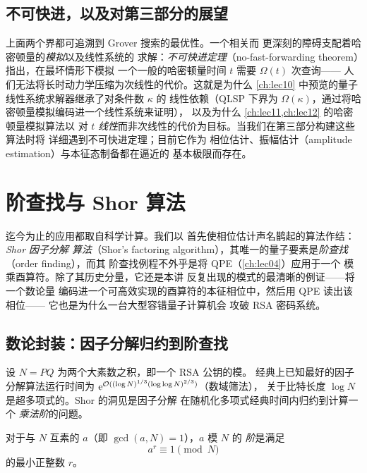 \subsection*{不可快进，以及对第三部分的展望}

上面两个界都可追溯到 Grover 搜索的最优性。一个相关而
更深刻的障碍支配着哈密顿量的\emph{模拟}以及线性系统的
求解：\emph{不可快进定理}（no-fast-forwarding theorem）指出，在最坏情形下模拟
一个一般的哈密顿量时间 $t$ 需要 $\Omega(t)$ 次查询——
人们无法将长时动力学压缩为次线性的代价。这就是为什么
\cref{ch:lec10} 中预览的量子线性系统求解器继承了对条件数 $\kappa$ 的
线性依赖（QLSP 下界为
$\Omega(\kappa)$，通过将哈密顿量模拟编码进一个线性系统来证明），
以及为什么 \cref{ch:lec11,ch:lec12} 的哈密顿量模拟算法以
对 $t$ \emph{线性}而非次线性的代价为目标。当我们在第三部分构建这些算法时将
详细遇到不可快进定理；目前它作为
相位估计、振幅估计（amplitude estimation）与本征态制备都在逼近的
基本极限而存在。

\section{阶查找与 Shor 算法}
\label{sec:lec05-5}

迄今为止的应用都取自科学计算。我们以
首先使相位估计声名鹊起的算法作结：\emph{Shor 因子分解
算法}（Shor's factoring algorithm），其唯一的量子要素是\emph{阶查找}（order finding），而其
阶查找例程不外乎是将 QPE（\cref{ch:lec04}）应用于一个
模乘酉算符。除了其历史分量，它还是本讲
反复出现的模式的最清晰的例证——将一个数论量
编码进一个可高效实现的酉算符的本征相位中，然后用 QPE 读出该相位——
它也是为什么一台大型容错量子计算机会
攻破 RSA 密码系统。

\subsection*{数论封装：因子分解归约到阶查找}

设 $N=PQ$ 为两个大素数之积，即一个 RSA 公钥的模。
经典上已知最好的因子分解算法运行时间为
$\mathrm{e}^{\mathcal{O}((\log N)^{1/3}(\log\log N)^{2/3})}$（数域筛法），
关于比特长度 $\log N$ 是超多项式的。Shor 的洞见是因子分解
在随机化多项式经典时间内归约到计算一个
\emph{乘法阶}的问题。

\begin{definition}[乘法阶]
\label{def:lec05-order}
对于与 $N$ 互素的 $a$（即 $\gcd(a,N)=1$），$a$ 模 $N$ 的
\emph{阶}是满足
\[
  a^{r}\equiv 1 \pmod N
\]
的最小正整数 $r$。
\end{definition}

